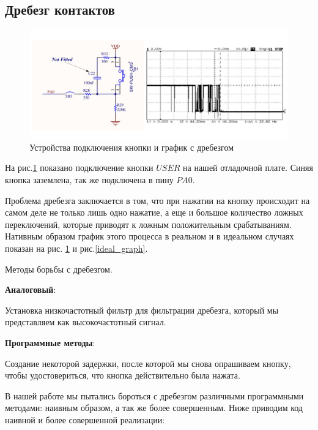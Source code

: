 \subsection{Дребезг контактов}


\begin{figure}[h!]
		\centering
		\includegraphics[width=1\linewidth]{pics/drebezg.png}
		\caption{Устройства подключения кнопки и график с дребезгом}
		\label{drebezg}
\end{figure}

На рис.\ref{drebezg} показано подключение кнопки $USER$ на нашей отладочной плате.
Синяя кнопка заземлена, так же подключена в пину $PA0$. 
	
	
Проблема дребезга заключается в том, что при нажатии на кнопку происходит на самом деле не только лишь одно нажатие, а еще и большое количество ложных переключений, которые приводят к ложным положительным срабатываниям. Нативным образом график этого процесса в реальном и в идеальном случаях показан на рис. \ref{drebezg} и рис.\ref{ideal_graph}.

Методы борьбы с дребезгом.

\textbf{Аналоговый}:

Установка низкочастотный фильтр для фильтрации дребезга, который мы представляем как высокочастотный сигнал.

\textbf{Программные методы}:

Создание некоторой задержки, после которой мы снова опрашиваем кнопку, чтобы удостовериться, что кнопка действительно была нажата.


В нашей работе мы пытались бороться с дребезгом различными программными методами: наивным образом, а так же более совершенным. Ниже приводим код наивной и более совершенной реализации:

